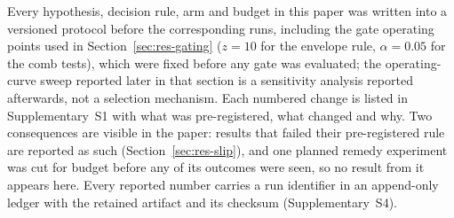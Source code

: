Every hypothesis, decision rule, arm and budget in this paper was written into a versioned protocol before the
corresponding runs, including the gate operating points used in Section~\ref{sec:res-gating} ($z = 10$ for the envelope
rule, $\alpha = 0.05$ for the comb tests), which were fixed before any gate was evaluated; the operating-curve sweep reported later in
that section is a sensitivity analysis reported afterwards, not a selection mechanism. Each numbered change is listed
in Supplementary~S1 with what was pre-registered, what changed and why. Two consequences are visible in the paper: results
that failed their pre-registered rule are reported as such (Section~\ref{sec:res-slip}), and one planned remedy experiment
was cut for budget before any of its outcomes were seen, so no result from it appears here. Every reported number carries a
run identifier in an append-only ledger with the retained artifact and its checksum (Supplementary~S4).
